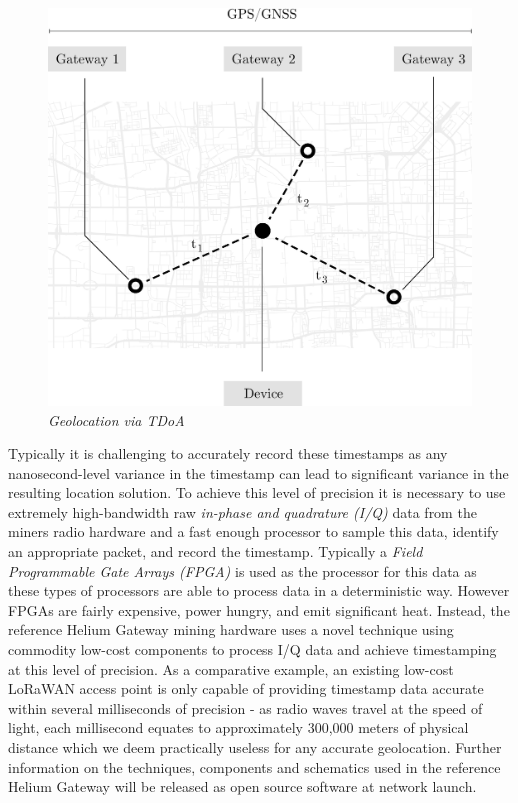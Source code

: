 \documentclass[10pt, nonatbib, nocopyrightspace, reprint]{sigplanconf}
\begin{document}
\begin{figure}[H]
    \begin{center}
          \includegraphics[width=\columnwidth]{tdoa.eps}
          \caption{\emph{Geolocation via TDoA}}
          \label{fig:tdoa}
     \end{center}
\end{figure}

Typically it is challenging to accurately record these timestamps as any nanosecond-level variance in the timestamp can lead to significant variance in the resulting location solution. To achieve this level of precision it is necessary to use extremely high-bandwidth raw \emph{in-phase and quadrature (I/Q)} data from the miners radio hardware and a fast enough processor to sample this data, identify an appropriate packet, and record the timestamp. Typically a \emph{Field Programmable Gate Arrays (FPGA)} is used as the processor for this data as these types of processors are able to process data in a deterministic way. However FPGAs are fairly expensive, power hungry, and emit significant heat. Instead, the reference Helium Gateway mining hardware uses a novel technique using commodity low-cost components to process I/Q data and achieve timestamping at this level of precision. As a comparative example, an existing low-cost LoRaWAN \cite{lorawan} access point is only capable of providing timestamp data accurate within several milliseconds of precision - as radio waves travel at the speed of light, each millisecond equates to approximately 300,000 meters of physical distance which we deem practically useless for any accurate geolocation. Further information on the techniques, components and schematics used in the reference Helium Gateway will be released as open source software at network launch. 
\end{document}
